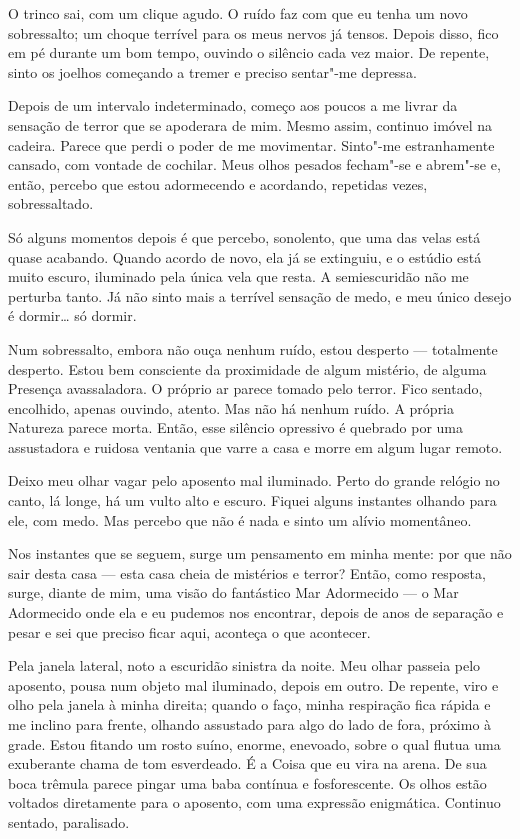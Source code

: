 O trinco sai, com um clique agudo. O ruído faz com que eu tenha um novo sobressalto; um choque terrível para os meus
nervos já tensos. Depois disso, fico em pé durante um bom tempo, ouvindo o silêncio cada vez maior. De repente, sinto
os joelhos começando a tremer e preciso sentar"-me depressa.

Depois de um intervalo indeterminado, começo aos poucos a me livrar da sensação de terror que se apoderara de mim.
Mesmo assim, continuo imóvel na cadeira. Parece que perdi o poder de me movimentar. Sinto"-me estranhamente cansado, com
vontade de cochilar. Meus olhos pesados fecham"-se e abrem"-se e, então, percebo que estou adormecendo e acordando,
repetidas vezes, sobressaltado.

Só alguns momentos depois é que percebo, sonolento, que uma das velas está quase acabando. Quando acordo de novo, ela
já se extinguiu, e o estúdio está muito escuro, iluminado pela única vela que resta. A semiescuridão não me perturba
tanto. Já não sinto mais a terrível sensação de medo, e meu único desejo é dormir\ldots{} só dormir.

Num sobressalto, embora não ouça nenhum ruído, estou desperto --- totalmente desperto. Estou bem consciente da
proximidade de algum mistério, de alguma Presença avassaladora. O próprio ar parece tomado pelo terror. Fico sentado,
encolhido, apenas ouvindo, atento. Mas não há nenhum ruído. A própria Natureza parece morta. Então, esse silêncio
opressivo é quebrado por uma assustadora e ruidosa ventania que varre a casa e morre em algum lugar remoto.

Deixo meu olhar vagar pelo aposento mal iluminado. Perto do grande relógio no canto, lá longe, há um vulto alto e
escuro. Fiquei alguns instantes olhando para ele, com medo. Mas percebo que não é nada e sinto um alívio momentâneo.

Nos instantes que se seguem, surge um pensamento em minha mente: por que não sair desta casa --- esta casa cheia de
mistérios e terror? Então, como resposta, surge, diante de mim, uma visão do fantástico Mar Adormecido --- o Mar
Adormecido onde ela e eu pudemos nos encontrar, depois de anos de separação e pesar e sei que preciso ficar aqui,
aconteça o que acontecer.

Pela janela lateral, noto a escuridão sinistra da noite. Meu olhar passeia pelo aposento, pousa num objeto mal
iluminado, depois em outro. De repente, viro e olho pela janela à minha direita; quando o faço, minha respiração
fica rápida e me inclino para frente, olhando assustado para algo do lado de fora, próximo à grade. Estou fitando um
rosto suíno, enorme, enevoado, sobre o qual flutua uma exuberante chama de tom esverdeado. É a Coisa que eu vira na arena.
De sua boca trêmula parece pingar uma baba contínua e fosforescente. Os olhos estão voltados diretamente para o
aposento, com uma expressão enigmática. Continuo sentado, paralisado.

